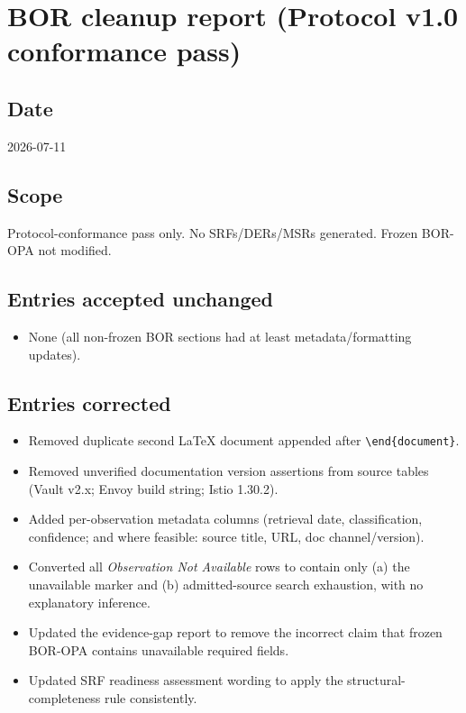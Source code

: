 \section*{BOR cleanup report (Protocol v1.0 conformance pass)}
\subsection*{Date}
2026-07-11

\subsection*{Scope}
Protocol-conformance pass only. No SRFs/DERs/MSRs generated. Frozen BOR-OPA not modified.

\subsection*{Entries accepted unchanged}
\begin{itemize}
  \item None (all non-frozen BOR sections had at least metadata/formatting updates).
\end{itemize}

\subsection*{Entries corrected}
\begin{itemize}
  \item Removed duplicate second LaTeX document appended after \texttt{\textbackslash end\{document\}}.
  \item Removed unverified documentation version assertions from source tables (Vault v2.x; Envoy build string; Istio 1.30.2).
  \item Added per-observation metadata columns (retrieval date, classification, confidence; and where feasible: source title, URL, doc channel/version).
  \item Converted all \emph{Observation Not Available} rows to contain only (a) the unavailable marker and (b) admitted-source search exhaustion, with no explanatory inference.
  \item Updated the evidence-gap report to remove the incorrect claim that frozen BOR-OPA contains unavailable required fields.
  \item Updated SRF readiness assessment wording to apply the structural-completeness rule consistently.
\end{itemize}

